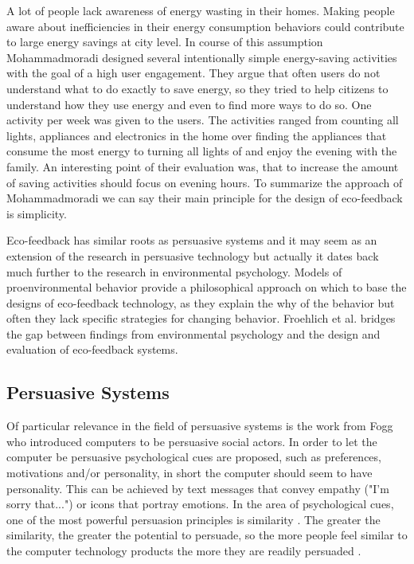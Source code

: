 A lot of people lack awareness of energy wasting in their homes. Making people aware about inefficiencies in their energy consumption behaviors could contribute to large energy savings at city level. In course of this assumption Mohammadmoradi \cite{mohammadmoradi2017effectiveness} designed several intentionally simple energy-saving activities with the goal of a high user engagement. They argue that often users do not understand what to do exactly to save energy, so they tried to help citizens to understand how they use energy and even to find more ways to do so. One activity per week was given to the users. The activities ranged from counting all lights, appliances and electronics in the home over finding the appliances that consume the most energy to turning all lights of and enjoy the evening with the family. An interesting point of their evaluation was, that to increase the amount of saving activities should focus on evening hours. To summarize the approach of Mohammadmoradi we can say their main principle for the design of eco-feedback is simplicity.

Eco-feedback has similar roots as persuasive systems and it may seem as an extension of the research in persuasive technology but actually it dates back much further to the research in environmental psychology. Models of proenvironmental behavior provide a philosophical approach on which to base the designs of eco-feedback technology, as they explain the why of the behavior but often they lack specific strategies for changing behavior. Froehlich et al. \cite{froehlich2010design} bridges the gap between findings from environmental psychology and the design and evaluation of eco-feedback systems.


\subsection{Persuasive Systems}
\label{chap:persuasivesystem}

Of particular relevance in the field of persuasive systems is the work from Fogg \cite{fogg2002persuasive} who introduced computers to be persuasive social actors. In order to let the computer be persuasive psychological cues are proposed, such as preferences, motivations and/or personality, in short the computer should seem to have personality. This can be achieved by text messages that convey empathy ("I'm sorry that...") or icons that portray emotions. In the area of psychological cues, one of the most powerful persuasion principles is similarity \cite{tajfel2010social}. The greater the similarity, the greater the potential to persuade, so the more people feel similar to the computer technology products the more they are readily persuaded \cite{fogg2002persuasive}.

